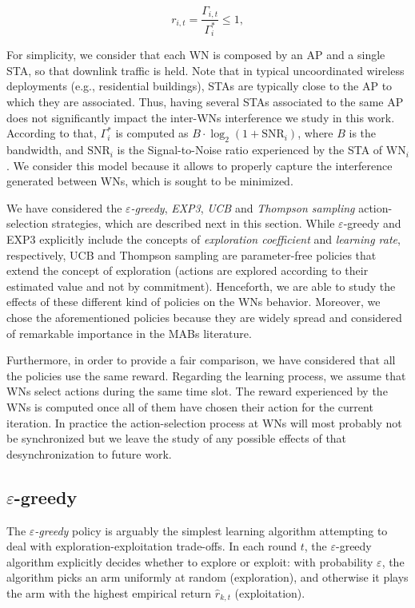 \documentclass[preprint,12pt]{elsarticle}
\begin{document}
\begin{equation}
r_{i,t} = {\frac{\Gamma_{i,t}}{{\Gamma_{i}^*}}} \leq 1,
\label{eq:reward_generation}
\nonumber
\end{equation}

For simplicity, we consider that each WN is composed by an AP and a single STA, so that downlink traffic is held. Note that in typical uncoordinated wireless deployments (e.g., residential buildings), STAs are typically close to the AP to which they are associated. Thus, having several STAs associated to the same AP does not significantly impact the inter-WNs interference we study in this work. According to that, $\Gamma_{i}^*$ is computed as $B \cdot \log_{2}(1 + \text{SNR}_{i})$, where $B$ is the bandwidth, and $\text{SNR}_{i}$ is the Signal-to-Noise ratio experienced by the STA of $\text{WN}_i$. We consider this model because it allows to properly capture the interference generated between WNs, which is sought to be minimized.

We have considered the \emph{$\varepsilon$-greedy}, \emph{EXP3}, \emph{UCB} and \emph{Thompson sampling} action-selection strategies, which are described next in this section. While $\varepsilon$-greedy and EXP3 explicitly include the concepts of \emph{exploration coefficient} and \emph{learning rate}, respectively, UCB and Thompson sampling are parameter-free policies that extend the concept of exploration (actions are explored according to their estimated value and not by commitment). Henceforth, we are able to study the effects of these different kind of policies on the WNs behavior. Moreover, we chose the aforementioned policies because they are widely spread and considered of remarkable importance in the MABs literature.

Furthermore, in order to provide a fair comparison, we have considered that all the policies use the same reward. Regarding the learning process, we assume that WNs select actions during the same time slot. The reward experienced by the WNs is computed once all of them have chosen their action for the current iteration. In practice the action-selection process at WNs will most probably not be synchronized but we leave the study of any possible effects of that desynchronization to future work.

\subsection{$\varepsilon$-greedy}
\label{section:bandits_egreedy}	
The \emph{$\varepsilon$-greedy} policy \cite{sutton1998reinforcement,auer2002finite} is arguably the simplest learning algorithm attempting to deal with exploration-exploitation trade-offs. In each round $t$, the $\varepsilon$-greedy algorithm explicitly decides whether to explore or exploit: with probability $\varepsilon$, the algorithm picks an arm uniformly at random (exploration), and otherwise it plays the arm with the highest empirical return $\hat{r}_{k,t}$ (exploitation). 
\end{document}
